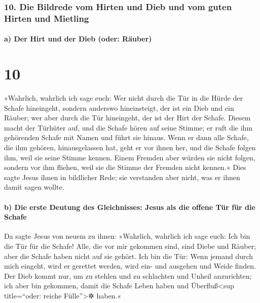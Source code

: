 \hypertarget{die-bildrede-vom-hirten-und-dieb-und-vom-guten-hirten-und-mietling}{%
\subsubsection{10. Die Bildrede vom Hirten und Dieb und vom guten Hirten
und
Mietling}\label{die-bildrede-vom-hirten-und-dieb-und-vom-guten-hirten-und-mietling}}

\hypertarget{a-der-hirt-und-der-dieb-oder-ruxe4uber}{%
\paragraph{a) Der Hirt und der Dieb (oder:
Räuber)}\label{a-der-hirt-und-der-dieb-oder-ruxe4uber}}

\hypertarget{section-9}{%
\section{10}\label{section-9}}

 »Wahrlich, wahrlich ich sage euch: Wer nicht durch die
Tür in die Hürde der Schafe hineingeht, sondern anderswo hineinsteigt,
der ist ein Dieb und ein Räuber;  wer aber durch die Tür
hineingeht, der ist der Hirt der Schafe.  Diesem macht der
Türhüter auf, und die Schafe hören auf seine Stimme; er ruft die ihm
gehörenden Schafe mit Namen und führt sie hinaus.  Wenn er
dann alle Schafe, die ihm gehören, hinausgelassen hat, geht er vor ihnen
her, und die Schafe folgen ihm, weil sie seine Stimme kennen.
 Einem Fremden aber würden sie nicht folgen, sondern vor
ihm fliehen, weil sie die Stimme der Fremden nicht kennen.«
 Dies sagte Jesus ihnen in bildlicher Rede; sie verstanden
aber nicht, was er ihnen damit sagen wollte.

\hypertarget{b-die-erste-deutung-des-gleichnisses-jesus-als-die-offene-tuxfcr-fuxfcr-die-schafe}{%
\paragraph{b) Die erste Deutung des Gleichnisses: Jesus als die offene
Tür für die
Schafe}\label{b-die-erste-deutung-des-gleichnisses-jesus-als-die-offene-tuxfcr-fuxfcr-die-schafe}}

 Da sagte Jesus von neuem zu ihnen: »Wahrlich, wahrlich
ich sage euch: Ich bin die Tür für die Schafe!  Alle, die
vor mir gekommen sind, sind Diebe und Räuber; aber die Schafe haben
nicht auf sie gehört.  Ich bin die Tür: Wenn jemand durch
mich eingeht, wird er gerettet werden, wird ein- und ausgehen und Weide
finden.  Der Dieb kommt nur, um zu stehlen und zu
schlachten und Unheil anzurichten; ich aber bin gekommen, damit die
Schafe Leben haben und Überfluß\textless sup title=``oder: reiche
Fülle''\textgreater✲ haben.«

